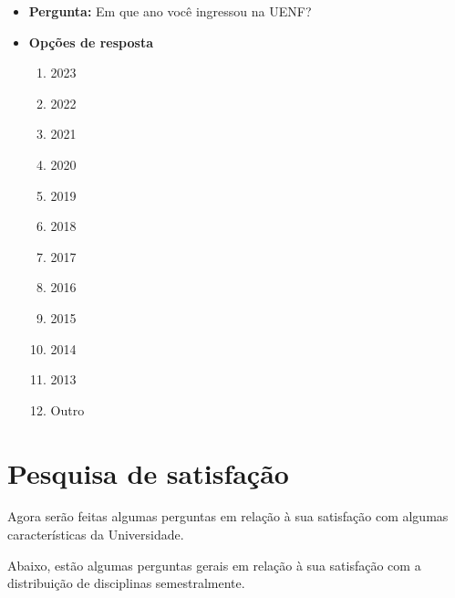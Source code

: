 \begin{apendicesenv}
  \begin{itemize}
    \item \textbf{Pergunta:} Em que ano você ingressou na UENF?
    \item \textbf{Opções de resposta}
          \begin{enumerate}
            \item 2023
            \item 2022
            \item 2021
            \item 2020
            \item 2019
            \item 2018
            \item 2017
            \item 2016
            \item 2015
            \item 2014
            \item 2013
            \item Outro
          \end{enumerate}
  \end{itemize}

  \section*{Pesquisa de satisfação}

  Agora serão feitas algumas perguntas em relação à sua satisfação com algumas características da Universidade.

  Abaixo, estão algumas perguntas gerais em relação à sua satisfação com a distribuição de disciplinas semestralmente.


\end{apendicesenv}
